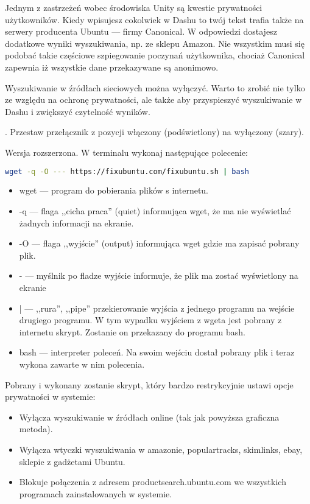 Jednym z zastrzeżeń wobec środowiska Unity są kwestie prywatności użytkowników. Kiedy wpisujesz cokolwiek w Dashu to twój tekst trafia także na serwery producenta Ubuntu --- firmy Canonical. W odpowiedzi dostajesz dodatkowe wyniki wyszukiwania, np. ze sklepu Amazon. Nie wszystkim musi się podobać takie częściowe szpiegowanie poczynań użytkownika, chociaż Canonical zapewnia iż wszystkie dane przekazywane są anonimowo.

Wyszukiwanie w źródłach sieciowych można wyłączyć. Warto to zrobić nie tylko ze względu na ochronę prywatności, ale także aby przyspieszyć wyszukiwanie w Dashu i zwiększyć czytelność wyników.

\noindent {}. Przestaw przełącznik z pozycji włączony (podświetlony) na wyłączony (szary).

Wersja rozszerzona. W terminalu wykonaj następujące polecenie:
\begin{lstlisting}[language=bash]
wget -q -O --- https://fixubuntu.com/fixubuntu.sh | bash
\end{lstlisting}
\begin{itemize}
\item \textcolor{ubuntu_orange}{wget} --- program do pobierania plików s internetu.
\item \textcolor{ubuntu_orange}{-q} --- flaga ,,cicha praca'' (quiet) informująca wget, że ma nie wyświetlać żadnych informacji na ekranie.
\item \textcolor{ubuntu_orange}{-O} --- flaga ,,wyjście'' (output) informująca wget gdzie ma zapisać pobrany plik.
\item \textcolor{ubuntu_orange}{-} --- myślnik po fladze wyjście informuje, że plik ma zostać wyświetlony na ekranie
\item \textcolor{ubuntu_orange}{|} --- ,,rura'', ,,pipe'' przekierowanie wyjścia z jednego programu na wejście drugiego programu. W tym wypadku wyjściem z wgeta jest pobrany z internetu skrypt. Zostanie on przekazany do programu bash.
\item \textcolor{ubuntu_orange}{bash} --- interpreter poleceń. Na swoim wejściu dostał pobrany plik i teraz wykona zawarte w nim polecenia.
\end{itemize}
Pobrany i wykonany zostanie skrypt, który bardzo restrykcyjnie ustawi opcje prywatności w systemie:
\begin{itemize}
\item Wyłącza wyszukiwanie w źródłach online (tak jak powyższa graficzna metoda).
\item Wyłącza wtyczki wyszukiwania w amazonie, populartracks, skimlinks, ebay, sklepie z gadżetami Ubuntu.
\item Blokuje połączenia z adresem productsearch.ubuntu.com we wszystkich programach zainstalowanych w systemie.
\end{itemize}

